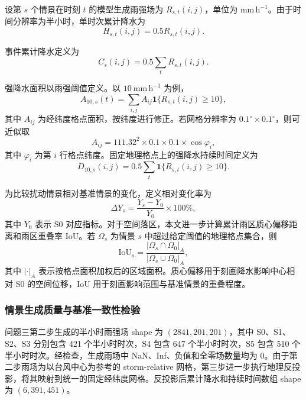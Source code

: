 设第 $s$ 个情景在时刻 $t$ 的模型生成雨强场为 $R_{s,t}(i,j)$，单位为 $\mathrm{mm\,h^{-1}}$。由于时间分辨率为半小时，单时次累计降水为
\begin{equation}
H_{s,t}(i,j)=0.5R_{s,t}(i,j).
\end{equation}

事件累计降水定义为
\begin{equation}
C_s(i,j)=0.5\sum_t R_{s,t}(i,j).
\end{equation}

强降水面积以雨强阈值定义。以 $10\ \mathrm{mm\,h^{-1}}$ 为例，
\begin{equation}
A_{10,s}(t)=\sum_{i,j} A_{ij}\mathbf{1}\{R_{s,t}(i,j)\ge 10\},
\end{equation}
其中 $A_{ij}$ 为经纬度格点面积，按纬度进行修正。若网格分辨率为 $0.1^\circ\times0.1^\circ$，则可近似取
\begin{equation}
A_{ij}=111.32^2\times 0.1\times 0.1\times \cos\varphi_i ,
\end{equation}
其中 $\varphi_i$ 为第 $i$ 行格点纬度。固定地理格点上的强降水持续时间定义为
\begin{equation}
D_{10,s}(i,j)=0.5\sum_t \mathbf{1}\{R_{s,t}(i,j)\ge 10\}.
\end{equation}

为比较扰动情景相对基准情景的变化，定义相对变化率为
\begin{equation}
\Delta Y_s=\frac{Y_s-Y_0}{Y_0}\times 100\%,
\end{equation}
其中 $Y_0$ 表示 S0 对应指标。对于空间落区，本文进一步计算累计雨区质心偏移距离和雨区重叠率 IoU。若 $\Omega_s$ 为情景 $s$ 中超过给定阈值的地理格点集合，则
\begin{equation}
\mathrm{IoU}_s=\frac{|\Omega_s\cap\Omega_0|_A}{|\Omega_s\cup\Omega_0|_A},
\end{equation}
其中 $|\cdot|_A$ 表示按格点面积加权后的区域面积。质心偏移用于刻画降水影响中心相对 S0 的空间位移，IoU 用于刻画影响范围与基准情景的重叠程度。

\subsubsection{情景生成质量与基准一致性检验}

问题三第二步生成的半小时雨强场 shape 为 $(2841,201,201)$，其中 S0、S1、S2、S3 分别包含 421 个半小时时次，S4 包含 647 个半小时时次，S5 包含 510 个半小时时次。经检查，生成雨场中 NaN、Inf、负值和全零场数量均为 0。由于第二步雨场为以台风中心为参考的 storm-relative 网格，第三步进一步执行地理反投影，将其映射到统一的固定经纬度网格。反投影后累计降水和持续时间数组 shape 为 $(6,391,451)$。

